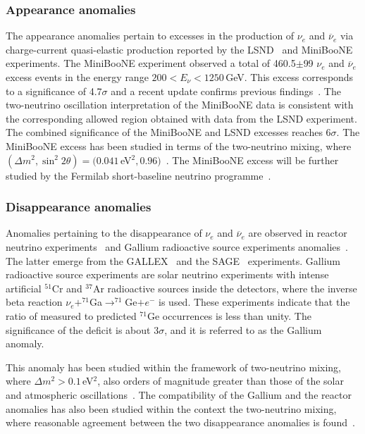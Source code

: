 \documentclass[10pt]{article}
\begin{document}
\subsubsection{Appearance anomalies}
%
The appearance anomalies pertain to excesses in the production of $\nu_e$ and $\overline{\nu}_e$ via charge-current quasi-elastic production reported by the  LSND~\cite{LSND:2001aii} and MiniBooNE~\cite{MiniBooNE:2018esg} experiments. The MiniBooNE experiment observed a total of 460.5$\pm$99 $\nu_e$ and $\overline{\nu}_e$ excess events in the energy range $200<E_\nu<1250$\,GeV. This excess corresponds to a significance of 4.7$\sigma$ and a recent update confirms previous findings~\cite{MiniBooNE:2020pnu}. 
The two-neutrino oscillation interpretation of the MiniBooNE data is consistent with the corresponding allowed region obtained with data from the LSND experiment. The combined significance of the MiniBooNE and LSND excesses reaches 6$\sigma$. The MiniBooNE excess has been studied in terms of the two-neutrino mixing, where $(\Delta m^2,\sin^2{2\theta})=(0.041$\,eV$^{2},0.96)$~\cite{MiniBooNE:2018esg}. The MiniBooNE excess will be further studied by the Fermilab short-baseline neutrino programme~\cite{MicroBooNE:2015bmn}.


\subsubsection{Disappearance anomalies}
%
Anomalies pertaining to the disappearance of $\nu_e$ and $\overline{\nu}_e$ are observed in reactor neutrino experiments~\cite{Declais:1994su,CHOOZ:2002qts,Mention:2011rk} 
and Gallium radioactive source experiments anomalies~\cite{Acero:2007su,Giunti:2010zu}. The latter emerge from the GALLEX~\cite{GALLEX:1994rym,GALLEX:1997lja,Kaether:2010ag} and the SAGE~\cite{Abdurashitov:1996dp,SAGE:1998fvr,Abdurashitov:2005tb,SAGE:2009eeu} experiments. Gallium radioactive source experiments are solar neutrino experiments with intense artificial $^{51}$Cr and $^{37}$Ar radioactive sources inside the detectors, where the inverse beta reaction $\nu_e+^{71}$Ga$\rightarrow ^{71}$Ge$+e^-$ is used. These experiments indicate that the ratio of measured to predicted $^{71}$Ge occurrences is less than unity. The significance of the deficit is about 3$\sigma$, and it is referred to as the Gallium anomaly. 

This anomaly has been studied within the framework of two-neutrino mixing, where $\Delta m^2>0.1$\,eV$^2$, also orders of magnitude greater than those of the solar and atmospheric oscillations~\cite{Acero:2007su,Giunti:2010zu}. The compatibility of the Gallium and the reactor anomalies has also been studied within the context the two-neutrino mixing, where reasonable agreement between the two disappearance anomalies is found~\cite{Acero:2007su}.
\end{document}
